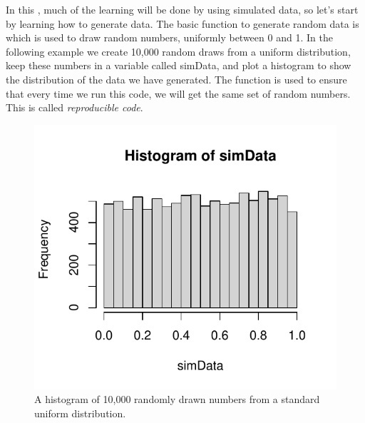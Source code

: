In this , much of the learning will be done by using simulated data, so let's start by learning how to generate data. The basic function to generate random data is  which is used to draw random numbers, uniformly between 0 and 1. In the following example we create 10,000 random draws from a uniform distribution, keep these numbers in a variable called simData, and plot a histogram to show the distribution of the data we have generated. The  function is used to ensure that every time we run this code, we will get the same set of random numbers. This is called \textit{reproducible code}. 
\begin{knitrout}
\color{fgcolor}\begin{kframe}
\begin{alltt}
\hlstd{(}\hlstd{)}
 \hlkwb{<-} 
 \hlkwb{<-} 
\end{alltt}
\end{kframe}\begin{figure}

{\centering \includegraphics[width=\maxwidth]{figure/intro-runif-1} 

}

\caption[A histogram of 10,000 randomly drawn numbers from a standard uniform distribution]{A histogram of 10,000 randomly drawn numbers from a standard uniform distribution.}\label{fig:intro-runif}
\end{figure}

\end{knitrout}


